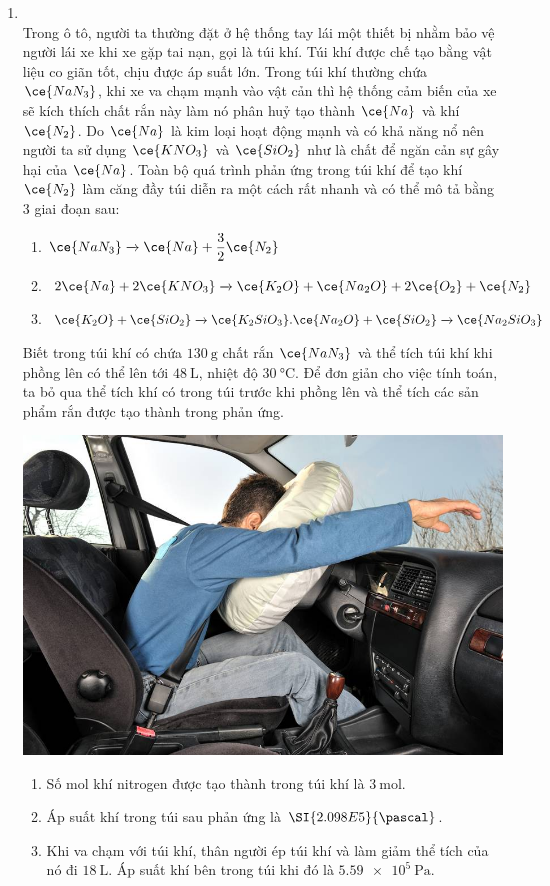 \begin{enumerate}[label=\bfseries Câu \arabic*:, leftmargin=1.7cm]
	
	\item {}\\
	Trong ô tô, người ta thường đặt ở hệ thống tay lái một thiết bị nhằm bảo vệ người lái xe khi xe gặp tai nạn, gọi là túi khí. Túi khí được chế tạo bằng vật liệu co giãn tốt, chịu được áp suất lớn. Trong túi khí thường chứa $\ce{NaN_3}$, khi xe va chạm mạnh vào vật cản thì hệ thống cảm biến của xe sẽ kích thích chất rắn này làm nó phân huỷ tạo thành $\ce{Na}$ và khí $\ce{N_2}$. Do $\ce{Na}$ là kim loại hoạt động mạnh và có khả năng nổ nên người ta sử dụng $\ce{KNO_3}$ và $\ce{SiO_2}$ như là chất để ngăn cản sự gây hại của $\ce{Na}$. Toàn bộ quá trình phản ứng trong túi khí để tạo khí $\ce{N_2}$ làm căng đầy túi diễn ra một cách rất nhanh và có thể mô tả bằng 3 giai đoạn sau:
	\begin{enumerate}[label=\arabic*)]
		\item $\ce{NaN_3}\xrightarrow{} \ce{Na}+\dfrac{3}{2}\ce{N_2}$
		\item $2\ce{Na}+2\ce{KNO_3}\xrightarrow{}\ce{K_2O}+\ce{Na_2O}+2\ce{O_2}+\ce{N_2}$
		\item $\ce{K_2O}+\ce{SiO_2}\xrightarrow{}\ce{K_2SiO_3}.\ce{Na_2O}+\ce{SiO_2}\xrightarrow{}\ce{Na_2SiO_3}$
	\end{enumerate}
Biết trong túi khí có chứa $\SI{130}{\gram}$ chất rắn $\ce{NaN_3}$ và thể tích túi khí khi phồng lên có thể lên tới $\SI{48}{\liter}$, nhiệt độ $\SI{30}{\celsius}$. Để đơn giản cho việc tính toán, ta bỏ qua thể tích khí có trong túi trước khi phồng lên và thể tích các sản phẩm rắn được tạo thành trong phản ứng.
\begin{center}
	\includegraphics[width=0.35\linewidth]{../figs/VN12-Y24-PH-SYL-013P-2}
\end{center}
\begin{enumerate}[label=\alph*)]
	\item Số mol khí nitrogen được tạo thành trong túi khí là $\SI{3}{\mole}$.
	\item Áp suất khí trong túi sau phản ứng là $\SI{2.098E5}{\pascal}$.
	\item Khi va chạm với túi khí, thân người ép túi khí và làm giảm thể tích của nó đi $\SI{18}{\liter}$. Áp suất khí bên trong túi khi đó là $\SI{5.59e5}{\pascal}$.

\end{enumerate}
\end{enumerate}
